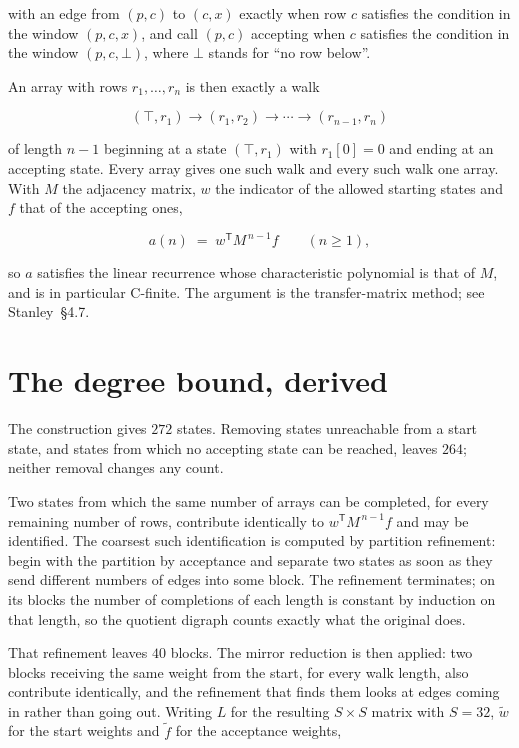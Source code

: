 \documentclass[11pt]{article}
\theoremstyle{definition}
\begin{document}
with an edge from $(p,c)$ to $(c,x)$ exactly when row $c$ satisfies the condition in the window $(p,c,x)$, and call $(p,c)$ accepting when $c$ satisfies the condition in the window $(p,c,\bot)$, where $\bot$ stands for ``no row below''.

An array with rows $r_1,\dots,r_n$ is then exactly a walk

\[(\top,r_1) \to (r_1,r_2) \to \cdots \to (r_{n-1},r_n)\]

of length $n-1$ beginning at a state $(\top,r_1)$ with $r_1[0]=0$ and ending at an accepting state. Every array gives one such walk and every such walk one array. With $M$ the adjacency matrix, $w$ the indicator of the allowed starting states and $f$ that of the accepting ones,

\[a(n) \;=\; w^{\mathsf T} M^{\,n-1} f \qquad (n \ge 1),\]

so $a$ satisfies the linear recurrence whose characteristic polynomial is that of $M$, and is in particular C-finite. The argument is the transfer-matrix method; see Stanley~\S4.7.

\section{The degree bound, derived}

The construction gives $272$ states. Removing states unreachable from a start state, and states from which no accepting state can be reached, leaves $264$; neither removal changes any count.

Two states from which the same number of arrays can be completed, for every remaining number of rows, contribute identically to $w^{\mathsf T}M^{\,n-1}f$ and may be identified. The coarsest such identification is computed by partition refinement: begin with the partition by acceptance and separate two states as soon as they send different numbers of edges into some block. The refinement terminates; on its blocks the number of completions of each length is constant by induction on that length, so the quotient digraph counts exactly what the original does.

That refinement leaves $40$ blocks. The mirror reduction is then applied: two blocks receiving the same weight from the start, for every walk length, also contribute identically, and the refinement that finds them looks at edges coming in rather than going out. Writing $L$ for the resulting $S \times S$ matrix with $S = 32$, $\tilde w$ for the start weights and $\tilde f$ for the acceptance weights,
\end{document}
